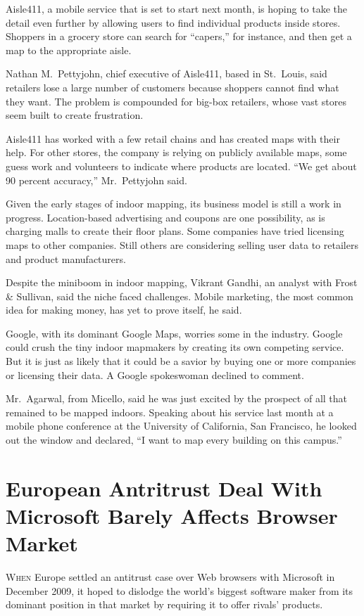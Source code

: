 ﻿\documentclass[12pt]{article}
\begin{document}
Aisle411, a mobile service that is set to start next month, is hoping to take the detail even
further by allowing users to find individual products inside stores. Shoppers in a grocery store can
search for ``capers,'' for instance, and then get a map to the appropriate aisle.

Nathan M.~Pettyjohn, chief executive of Aisle411, based in St.~Louis, said retailers lose a large
number of customers because shoppers cannot find what they want. The problem is compounded for
big-box retailers, whose vast stores seem built to create frustration.

Aisle411 has worked with a few retail chains and has created maps with their help. For other stores,
the company is relying on publicly available maps, some guess work and volunteers to indicate where
products are located. ``We get about 90 percent accuracy,'' Mr.~Pettyjohn said.

Given the early stages of indoor mapping, its business model is still a work in progress.
Location-based advertising and coupons are one possibility, as is charging malls to create their
floor plans. Some companies have tried licensing maps to other companies. Still others are
considering selling user data to retailers and product manufacturers.

Despite the miniboom in indoor mapping, Vikrant Gandhi, an analyst with Frost \& Sullivan, said the
niche faced challenges. Mobile marketing, the most common idea for making money, has yet to prove
itself, he said.

Google, with its dominant Google Maps, worries some in the industry. Google could crush the tiny
indoor mapmakers by creating its own competing service. But it is just as likely that it could be a
savior by buying one or more companies or licensing their data. A Google spokeswoman declined to
comment.

Mr.~Agarwal, from Micello, said he was just excited by the prospect of all that remained to be
mapped indoors. Speaking about his service last month at a mobile phone conference at the University
of California, San Francisco, he looked out the window and declared, ``I want to map every building
on this campus.''

\section{European Antritrust Deal With Microsoft Barely Affects Browser Market}

\lettrine{W}{hen} Europe settled an antitrust case over Web browsers with
Microsoft in December 2009, it hoped to dislodge the world's biggest software maker from its
dominant position in that market by requiring it to offer rivals' products.
\end{document}
